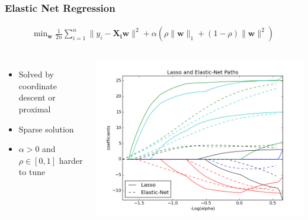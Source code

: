 \begin{frame}
\frametitle{Elastic Net Regression}

\begin{align*}
\text{min}_{\mathbf{w}} \; \frac{1}{2n} \sum_{i=1}^n \|y_i - \mathbf{X_i}\mathbf{w}\|^2 + \alpha \left( \rho \|\mathbf{w}\|_1 + (1-\rho) \|\mathbf{w}\|^2 \right) 
\end{align*}

\begin{columns}
\begin{itemize}
\item Solved by coordinate descent or proximal
\item Sparse solution
\item $\alpha > 0$ and $\rho \in [0,1]$ harder to tune
\end{itemize}
\includegraphics[width=\textwidth]{sklearn_material/plot_lasso_coordinate_descent_path_0011.png}

\end{columns}
\end{frame}
